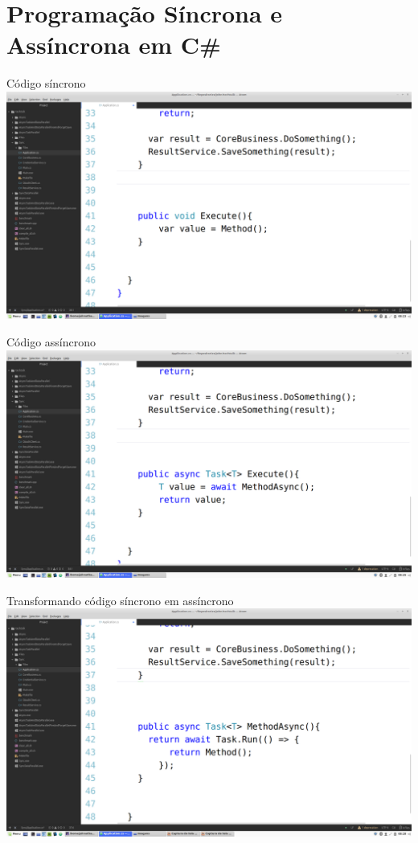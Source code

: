 \documentclass[10pt]{beamer}
\begin{document}
\section{Programação Síncrona e Assíncrona em C\#}

\begin{frame}{Código síncrono}
	\includegraphics[width=\textwidth]{imgs/00-sync.png}
\end{frame}

\begin{frame}{Código assíncrono}
	\includegraphics[width=\textwidth]{imgs/01-async.png}
\end{frame}

\begin{frame}{Transformando código síncrono em assíncrono}
	\includegraphics[width=\textwidth]{imgs/02-syncToAsync.png}
\end{frame}
\end{document}
